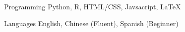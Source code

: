 

\begin{cvskills}

  \cvskill
    {Programming} %
    {Python, R, HTML/CSS, Javsacript, LaTeX} %


  \cvskill
    {Languages} %
    {English, Chinese (Fluent), Spanish (Beginner)} %

\end{cvskills}
